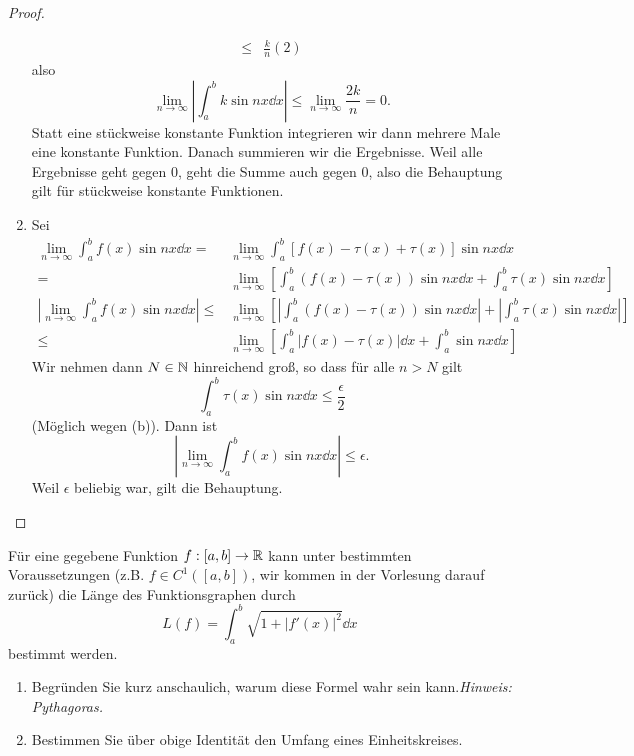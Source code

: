 \begin{proof}
\begin{enumerate}[label=(\roman*)]
\begin{align*}
				\le& \frac{k}{n}(2)
			\end{align*}
			also
			\[
				\lim_{n \to \infty} \left| \int_a^b k\sin nx\dd{x} \right| \le \lim_{n \to \infty} \frac{2k}{n}=0
			.\] 
			Statt eine stückweise konstante Funktion integrieren wir dann mehrere Male eine konstante Funktion. Danach summieren wir die Ergebnisse. Weil alle Ergebnisse geht gegen $0$, geht die Summe auch gegen $0$, also die Behauptung gilt für stückweise konstante Funktionen.
		\item Sei 
			\begin{align*}
				\lim_{n \to \infty} \int_a^b f(x)\sin nx\dd{x}=& \lim_{n \to \infty} \int_a^b \left[ f(x)-\tau(x)+\tau(x) \right] \sin nx\dd{x}\\
				=&\lim_{n \to \infty} \left[ \int_a^b (f(x)-\tau(x))\sin nx\dd{x}+\int_a^b \tau(x)\sin nx\dd{x} \right] \\
				\left| \lim_{n \to \infty} \int_a^b f(x)\sin nx\dd{x} \right| \le& \lim_{n \to \infty} \left[ \left| \int_a^b (f(x)-\tau(x))\sin nx\dd{x} \right|+\left| \int_a^b \tau(x)\sin nx \dd{x} \right|   \right] \\
				\le& \lim_{n \to \infty} \left[ \int_a^b |f(x)-\tau(x)|\dd{x}+\int_a^b\sin nx\dd{x} \right]
			\end{align*}
			Wir nehmen dann $N\in \mathbb{N}$ hinreichend groß, so dass f\"{u}r alle $n>N$ gilt
			\[
				\int_a^b \tau(x)\sin nx\dd{x}\le \frac{\epsilon}{2}
			\]
			(Möglich wegen (b)). Dann ist
			\[
				\left| \lim_{n \to \infty} \int_a^b f(x)\sin nx\dd{x} \right| \le \epsilon
			.\] 
			Weil $\epsilon$ beliebig war, gilt die Behauptung.\qedhere
	\end{enumerate}
\end{proof}
\begin{Problem}
	F\"{u}r eine gegebene Funktion $f:[a,b]\to \mathbb{R}$ kann unter bestimmten Voraussetzungen (z.B. $f\in C^1([a,b])$, wir kommen in der Vorlesung darauf zurück) die Länge des Funktionsgraphen durch
	\[
		L(f)=\int_a^b \sqrt{1+|f'(x)|^2} \dd{x}\] 
		bestimmt werden.
		\begin{enumerate}[label=(\roman*)]
			\item Begründen Sie kurz anschaulich, warum diese Formel wahr sein kann.\emph{Hinweis: Pythagoras.}
			\item Bestimmen Sie über obige Identität den Umfang eines Einheitskreises.
		\end{enumerate}
\end{Problem}
